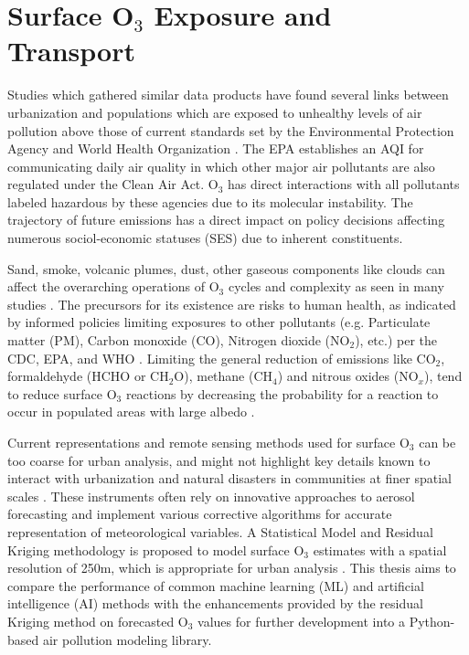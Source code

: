 \section{Surface O$_3$ Exposure and Transport} \label{introchap:surfeat} Studies which gathered similar data products have found several links between urbanization and populations which are exposed to unhealthy levels of air pollution above those of current standards set by the Environmental Protection Agency and World Health Organization \parencite{epa_climate_2021,kumar_integrated_2015,liu_impact_2022}. The EPA establishes an AQI for communicating daily air quality in which other major air pollutants are also regulated under the Clean Air Act. O$_3$ has direct interactions with all pollutants labeled hazardous by these agencies due to its molecular instability. The trajectory of future emissions has a direct impact on policy decisions affecting numerous sociol-economic statuses (SES) due to inherent constituents. 

Sand, smoke, volcanic plumes, dust, other gaseous components like clouds can affect the overarching operations of O$_3$ cycles and complexity as seen in many studies \parencite{harithasree_surface_2024,venkanna_environmental_2015,tong_characteristics_2017}. The precursors for its existence are risks to human health, as indicated by informed policies limiting exposures to other pollutants (e.g. Particulate matter (PM), Carbon monoxide (CO), Nitrogen dioxide (NO$_2$), etc.) per the CDC, EPA, and WHO \cite{cdc_air_2024,epa_benefits_2015,liu_toward_2024}. Limiting the general reduction of emissions like CO$_2$, formaldehyde (HCHO or CH$_2$O), methane (CH$_4$) and nitrous oxides (NO$_x$), tend to reduce surface O$_3$ reactions by decreasing the probability for a reaction to occur in populated areas with large albedo \parencite{al-harbi_spatiotemporal_2020,badia_modelling_2023,wu_hybrid_2023}. 

Current representations and remote sensing methods used for surface O$_3$ can be too coarse for urban analysis, and might not highlight key details known to interact with urbanization and natural disasters in communities at finer spatial scales \parencite{nawaz_source_2023,zhang_effect_2019,abdullah_development_2019}. These instruments often rely on innovative approaches to aerosol forecasting and implement various corrective algorithms for accurate representation of meteorological variables. A Statistical Model and Residual Kriging methodology is proposed to model surface O$_3$ estimates with a spatial resolution of 250m, which is appropriate for urban analysis \parencite{wang_does_2023}. This thesis aims to compare the performance of common machine learning (ML) and artificial intelligence (AI) methods with the enhancements provided by the residual Kriging method on forecasted O$_3$ values for further development into a Python-based air pollution modeling library.
